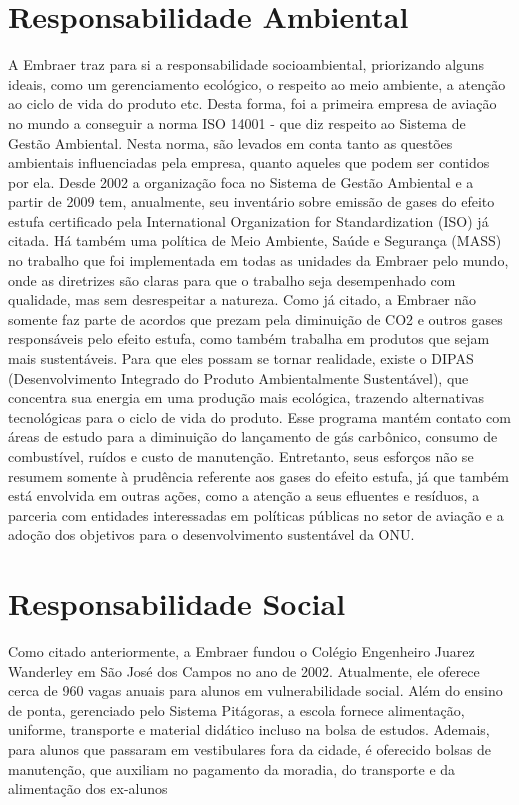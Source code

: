 \section{Responsabilidade Ambiental}
A Embraer traz para si a responsabilidade socioambiental, priorizando alguns ideais, como um gerenciamento ecológico, o respeito ao meio ambiente, a atenção ao ciclo de vida do produto etc. Desta forma, foi a primeira empresa de aviação no mundo a conseguir a norma ISO 14001 - que diz respeito ao Sistema de Gestão Ambiental. Nesta norma, são levados em conta tanto as questões ambientais influenciadas pela empresa, quanto aqueles que podem ser contidos por ela. Desde 2002 a organização foca no Sistema de Gestão Ambiental e a partir de 2009 tem, anualmente, seu inventário sobre emissão de gases do efeito estufa certificado pela International Organization for Standardization (ISO) já citada. Há também uma política de Meio Ambiente, Saúde e Segurança (MASS) no trabalho que foi implementada em todas as unidades da Embraer pelo mundo, onde as diretrizes são claras para que o trabalho seja desempenhado com qualidade, mas sem desrespeitar a natureza.
Como já citado, a Embraer não somente faz parte de acordos que prezam pela diminuição de CO2 e outros gases responsáveis pelo efeito estufa, como também trabalha em produtos que sejam mais sustentáveis. Para que eles possam se tornar realidade, existe o DIPAS (Desenvolvimento Integrado do Produto Ambientalmente Sustentável), que concentra sua energia em uma produção mais ecológica, trazendo alternativas tecnológicas para o ciclo de vida do produto. Esse programa mantém contato com áreas de estudo para a diminuição do lançamento de gás carbônico, consumo de combustível, ruídos e custo de manutenção.
Entretanto, seus esforços não se resumem somente à prudência referente aos gases do efeito estufa, já que também está envolvida em outras ações, como a atenção a seus efluentes e resíduos, a parceria com entidades interessadas em políticas públicas no setor de aviação e a adoção dos objetivos para o desenvolvimento sustentável da ONU.


\section{Responsabilidade Social}
Como citado anteriormente, a Embraer fundou o Colégio Engenheiro Juarez Wanderley em São José dos Campos no ano de 2002. Atualmente, ele oferece cerca de 960 vagas anuais para alunos em vulnerabilidade social. Além do ensino de ponta, gerenciado pelo Sistema Pitágoras, a escola fornece alimentação, uniforme, transporte e material didático incluso na bolsa de estudos. Ademais, para alunos que passaram em vestibulares fora da cidade, é oferecido bolsas de manutenção, que auxiliam no pagamento da moradia, do transporte e da alimentação dos ex-alunos



